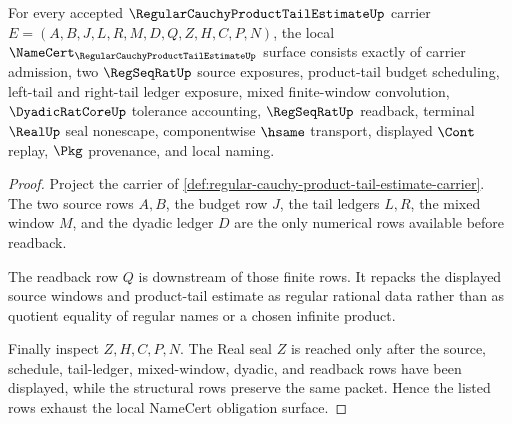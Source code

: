\begin{theorem}
\label{thm:regular-cauchy-product-tail-estimate-namecert-obligations}
For every accepted $\RegularCauchyProductTailEstimateUp$ carrier $E=(A,B,J,L,R,M,D,Q,Z,H,C,P,N)$, the local $\NameCert_{\RegularCauchyProductTailEstimateUp}$ surface consists exactly of carrier admission, two $\RegSeqRatUp$ source exposures, product-tail budget scheduling, left-tail and right-tail ledger exposure, mixed finite-window convolution, $\DyadicRatCoreUp$ tolerance accounting, $\RegSeqRatUp$ readback, terminal $\RealUp$ seal nonescape, componentwise $\hsame$ transport, displayed $\Cont$ replay, $\Pkg$ provenance, and local naming.
\end{theorem}
\begin{proof}
Project the carrier of \autoref{def:regular-cauchy-product-tail-estimate-carrier}. The two source rows $A,B$, the budget row $J$, the tail ledgers $L,R$, the mixed window $M$, and the dyadic ledger $D$ are the only numerical rows available before readback.

The readback row $Q$ is downstream of those finite rows. It repacks the displayed source windows and product-tail estimate as regular rational data rather than as quotient equality of regular names or a chosen infinite product.

Finally inspect $Z,H,C,P,N$. The Real seal $Z$ is reached only after the source, schedule, tail-ledger, mixed-window, dyadic, and readback rows have been displayed, while the structural rows preserve the same packet. Hence the listed rows exhaust the local NameCert obligation surface.
\end{proof}


